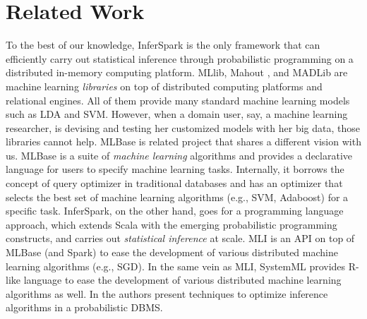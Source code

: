 
\section{Related Work}
\label{sec:related}

To the best of our knowledge, InferSpark is the only framework that can efficiently carry out statistical inference through probabilistic programming on a distributed in-memory computing platform.
MLlib, Mahout \cite{mahout}, and MADLib \cite{madlib} are machine learning \emph{libraries} on top of distributed computing platforms and relational engines.
All of them provide many standard machine learning models such as LDA and SVM.
However, when a domain user, say, a machine learning researcher, 
is devising and testing her customized models with her big data, 
those libraries cannot help.
MLBase \cite{mlbase} is related project that shares a different vision with us.
MLBase is a suite of {\em machine learning} algorithms and provides 
a declarative language for users to specify machine learning tasks.
Internally, it borrows the concept of query optimizer in traditional databases 
and has an optimizer that selects the best set of machine learning 
algorithms (e.g., SVM, Adaboost) for a specific task.
InferSpark, on the other hand, goes for a programming language approach, 
which extends Scala with the emerging probabilistic programming constructs,
and carries out {\em statistical inference} at scale. 
MLI \cite{mli} is an API on top of MLBase (and Spark) to ease the development of various distributed machine learning algorithms (e.g., SGD).
In the same vein as MLI, SystemML \cite{systemml} provides R-like language to ease the development of various distributed machine learning algorithms as well.
In \cite{Wang:2011} the authors present techniques to optimize inference algorithms in a probabilistic DBMS.


